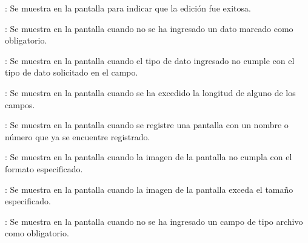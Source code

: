 \begin{Citemize}
	\item {}: Se muestra en la pantalla  para indicar que la edición fue exitosa.
	\item {}: Se muestra en la pantalla  cuando no se ha ingresado un dato marcado como obligatorio.
	\item {}: Se muestra en la pantalla  cuando el tipo de dato ingresado no cumple con el tipo de dato solicitado en el campo.
	\item {}: Se muestra en la pantalla  cuando se ha excedido la longitud de alguno de los campos.
	\item {}: Se muestra en la pantalla  cuando se registre una pantalla con un nombre o número que ya se encuentre registrado.
	\item {}: Se muestra en la pantalla  cuando la imagen de la pantalla no cumpla con el formato especificado.
	\item {}: Se muestra en la pantalla  cuando la imagen de la pantalla exceda el tamaño especificado.
	\item {}: Se muestra en la pantalla  cuando no se ha ingresado un campo de tipo archivo como obligatorio.
\end{Citemize}
